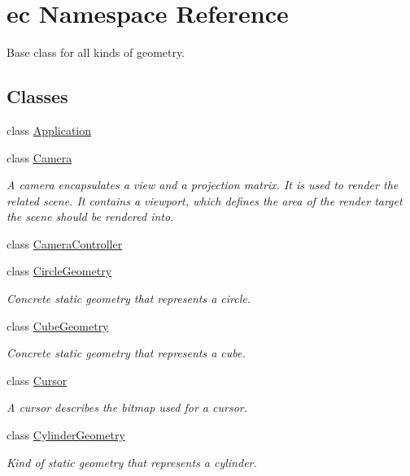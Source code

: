 \hypertarget{namespaceec}{}\section{ec Namespace Reference}
\label{namespaceec}


Base class for all kinds of geometry.  


\subsection*{Classes}
\begin{DoxyCompactItemize}
\item 
class \mbox{\hyperlink{classec_1_1_application}{Application}}
\item 
class \mbox{\hyperlink{classec_1_1_camera}{Camera}}
\begin{DoxyCompactList}\small\item\em A camera encapsulates a view and a projection matrix. It is used to render the related scene. It contains a viewport, which defines the area of the render target the scene should be rendered into. \end{DoxyCompactList}\item 
class \mbox{\hyperlink{classec_1_1_camera_controller}{Camera\+Controller}}
\item 
class \mbox{\hyperlink{classec_1_1_circle_geometry}{Circle\+Geometry}}
\begin{DoxyCompactList}\small\item\em Concrete static geometry that represents a circle. \end{DoxyCompactList}\item 
class \mbox{\hyperlink{classec_1_1_cube_geometry}{Cube\+Geometry}}
\begin{DoxyCompactList}\small\item\em Concrete static geometry that represents a cube. \end{DoxyCompactList}\item 
class \mbox{\hyperlink{classec_1_1_cursor}{Cursor}}
\begin{DoxyCompactList}\small\item\em A cursor describes the bitmap used for a cursor. \end{DoxyCompactList}\item 
class \mbox{\hyperlink{classec_1_1_cylinder_geometry}{Cylinder\+Geometry}}
\begin{DoxyCompactList}\small\item\em Kind of static geometry that represents a cylinder. \end{DoxyCompactList}\item 

\end{DoxyCompactItemize}

